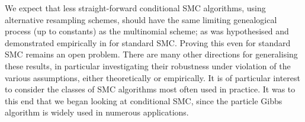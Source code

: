 \documentclass{article}
\begin{document}
We expect that less straight-forward conditional SMC algorithms, using alternative resampling schemes, should have the same limiting genealogical process (up to constants) as the multinomial scheme; as was hypothesised and demonstrated empirically in \citet{koskela2018} for standard SMC. Proving this even for standard SMC remains an open problem.
There are many other directions for generalising these results, in particular investigating their robustness under violation of the various assumptions, either theoretically or empirically. It is of particular interest to consider the classes of SMC algorithms most often used in practice. It was to this end that we began looking at conditional SMC, since the particle Gibbs algorithm is widely used in numerous applications.


\end{document}

